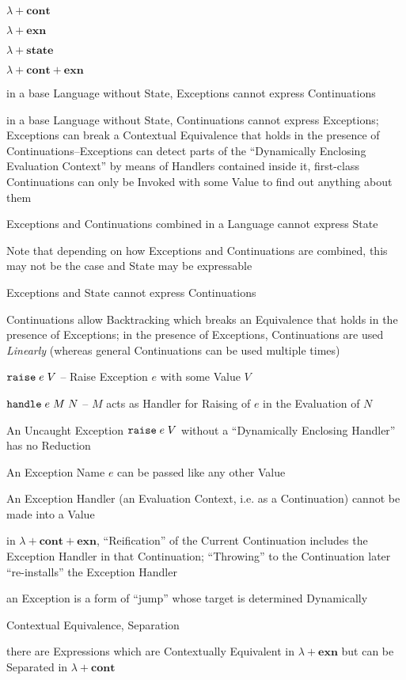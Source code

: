 $\lambda + \mathbf{cont}$

$\lambda + \mathbf{exn}$

$\lambda + \mathbf{state}$

$\lambda + \mathbf{cont} + \mathbf{exn}$

in a base Language without State, Exceptions cannot express
Continuations

in a base Language without State, Continuations cannot express
Exceptions; Exceptions can break a Contextual Equivalence that holds
in the presence of Continuations--Exceptions can detect parts of the
``Dynamically Enclosing Evaluation Context'' by means of Handlers
contained inside it, first-class Continuations can only be Invoked
with some Value to find out anything about them

Exceptions and Continuations combined in a Language cannot express
State

\fist Note that depending on how Exceptions and Continuations are
combined, this may not be the case and State may be expressable

Exceptions and State cannot express Continuations

Continuations allow Backtracking which breaks an Equivalence that
holds in the presence of Exceptions; in the presence of Exceptions,
Continuations are used \emph{Linearly} (whereas general Continuations
can be used multiple times)

$\mathtt{raise}\;e\;V$ -- Raise Exception $e$ with some Value $V$

$\mathtt{handle}\;e\;M\;N$ -- $M$ acts as Handler for Raising of $e$ in
the Evaluation of $N$

An Uncaught Exception $\mathtt{raise}\;e\;V$ without a ``Dynamically
Enclosing Handler'' has no Reduction

An Exception Name $e$ can be passed like any other Value

An Exception Handler (an Evaluation Context, i.e. as a Continuation)
cannot be made into a Value

in $\lambda + \mathbf{cont} + \mathbf{exn}$, ``Reification'' of the
Current Continuation includes the Exception Handler in that
Continuation; ``Throwing'' to the Continuation later ``re-installs''
the Exception Handler

an Exception is a form of ``jump'' whose target is determined
Dynamically %

Contextual Equivalence, Separation %

there are Expressions which are Contextually Equivalent in $\lambda +
\mathbf{exn}$ but can be Separated in $\lambda + \mathbf{cont}$


